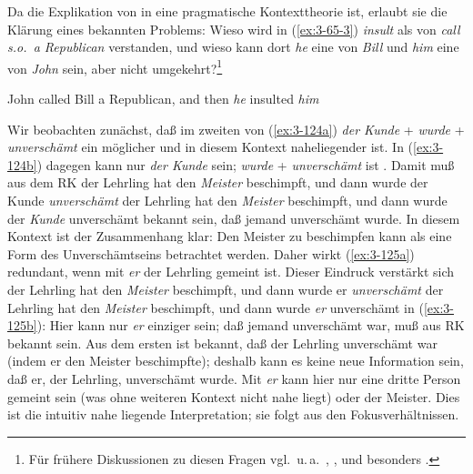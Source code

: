 \documentclass[output=paper]{langsci/langscibook}
\begin{document}
Da die Explikation von  in eine pragmatische
Kontexttheorie  ist, erlaubt sie die Klärung eines
bekannten Problems: Wieso wird in (\ref{ex:3-65-3}) \textit{insult} als  von
\textit{call s.o.\ a Republican} verstanden, und wieso kann dort
\textit{he} eine  von \textit{Bill} und \textit{him} eine
 von \textit{John} sein, aber nicht
umgekehrt?\footnote{\label{fn:3-26}%
  Für frühere Diskussionen zu diesen
  Fragen vgl.\ u.\,a.\ \citet{Lakoff71}, \citet[63-75]{Schmerling76},
  \citet[§8.6.1.]{Kempson75} und besonders \citet[§ 2.1.]{Prince79}.%
}
\begin{exe}
\label{ex:3-65-3} John called Bill a Republican, and then \textit{he} insulted \textit{him} 
\end{exe}
Wir beobachten zunächst, daß im zweiten  von (\ref{ex:3-124a}) \textit{der Kunde} +
\textit{wurde} + \textit{unverschämt} ein möglicher und in diesem Kontext naheliegender
 ist. In (\ref{ex:3-124b}) dagegen kann nur \textit{der Kunde}  sein; \textit{wurde} +
\textit{unverschämt} ist . Damit muß aus dem RK
\eal
\label{ex:3-124}
\ex
\label{ex:3-124a}
der Lehrling hat den \textit{Meister} beschimpft, und dann wurde der Kunde \textit{unverschämt}
\ex
\label{ex:3-124b}
der Lehrling hat den \textit{Meister} beschimpft, und dann wurde der \textit{Kunde} unverschämt
\zl
bekannt sein, daß jemand unverschämt wurde. In diesem Kontext ist der
Zusammenhang klar: Den Meister zu beschimpfen kann als eine Form des
Unverschämtseins betrachtet werden. Daher wirkt (\ref{ex:3-125a}) redundant,
wenn mit \textit{er} der Lehrling gemeint ist. Dieser Eindruck verstärkt sich
\eal
\label{ex:3-125}
\ex
\label{ex:3-125a}
der Lehrling hat den \textit{Meister} beschimpft, und dann wurde er \textit{unverschämt}
\ex
\label{ex:3-125b}
der Lehrling hat den \textit{Meister} beschimpft, und dann wurde \textit{er} unverschämt
\zl
in (\ref{ex:3-125b}): Hier kann nur \textit{er} einziger  sein; daß jemand unverschämt war, muß aus RK bekannt sein. Aus dem ersten  ist
bekannt, daß der Lehrling unverschämt war (indem er den Meister beschimpfte); deshalb kann es keine neue Information sein, daß er, der
Lehrling, unverschämt wurde. Mit \textit{er} kann hier nur eine dritte Person gemeint sein (was ohne weiteren Kontext nicht nahe liegt) oder der
Meister. Dies ist die intuitiv nahe liegende Interpretation; sie folgt aus den Fokusverhältnissen.
\end{document}
